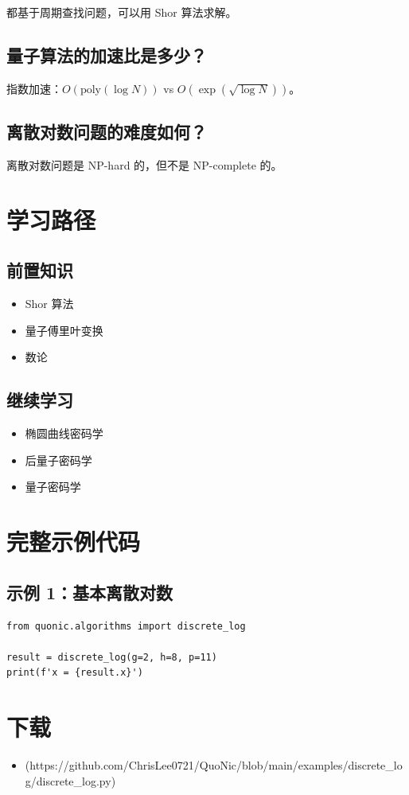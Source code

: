 \documentclass[12pt,a4paper]{article}
\begin{document}
都基于周期查找问题，可以用 Shor 算法求解。

\subsection{量子算法的加速比是多少？}

指数加速：$O(\text{poly}(\log N))$ vs $O(\exp(\sqrt{\log N}))$。

\subsection{离散对数问题的难度如何？}

离散对数问题是 NP-hard 的，但不是 NP-complete 的。

\section{学习路径}

\subsection{前置知识}
\begin{itemize}
  \item Shor 算法
  \item 量子傅里叶变换
  \item 数论
\end{itemize}

\subsection{继续学习}
\begin{itemize}
  \item 椭圆曲线密码学
  \item 后量子密码学
  \item 量子密码学
\end{itemize}

\section{完整示例代码}

\subsection{示例 1：基本离散对数}

\begin{verbatim}
from quonic.algorithms import discrete_log

result = discrete_log(g=2, h=8, p=11)
print(f'x = {result.x}')
\end{verbatim}

\section{下载}

\begin{itemize}
  \item [discrete\_log.py](https://github.com/ChrisLee0721/QuoNic/blob/main/examples/discrete_log/discrete_log.py)
\end{itemize}
\end{document}
